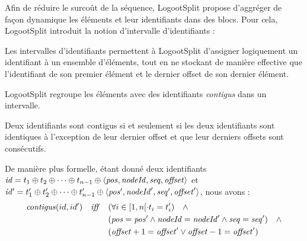 \label{sec:blocs}

Afin de réduire le surcoût de la séquence, LogootSplit propose d'aggréger de façon dynamique les éléments et leur identifiants dans des blocs.
Pour cela, LogootSplit introduit la notion d'intervalle d'identifiants :

\noindent{}

Les intervalles d'identifiants permettent à LogootSplit d'assigner logiquement un identifiant à un ensemble d'éléments, tout en ne stockant de manière effective que l'identifiant de son premier élément et le dernier offset de son dernier élément.

LogootSplit regroupe les éléments avec des identifiants \emph{contigus} dans un intervalle.
\begin{definition}
  Deux identifiants sont contigus si et seulement si les deux identifiants sont identiques à l'exception de leur dernier offset et que leur derniers offsets sont consécutifs.

  De manière plus formelle, étant donné deux identifiants $\mathit{id} = t_1 \oplus t_2 \oplus \cdots \oplus t_{n-1} \oplus \langle \mathit{pos},\mathit{nodeId},\mathit{seq},\mathit{offset} \rangle$ et $\mathit{id'} = t^\prime_1 \oplus t^\prime_2 \oplus \cdots \oplus t^\prime_{n-1} \oplus \langle \mathit{pos}',\mathit{nodeId}',\mathit{seq}',\mathit{offset}' \rangle$, nous avons :
  \begin{equation*}
    \begin{split}
      \mathit{contigus}(id,id') \quad \mathit{iff} \quad     & (\forall i \in [1,n[ \cdot t_i = t'_i) \quad \land \\
                                            & (\mathit{pos} = \mathit{pos}' \land \mathit{nodeId} = \mathit{nodeId}' \land \mathit{seq} = \mathit{seq}') \quad \land \\
                                            & (\mathit{offset} + 1 = \mathit{offset}' \lor \mathit{offset} - 1 = \mathit{offset}') \\
    \end{split}
  \end{equation*}

\end{definition}


